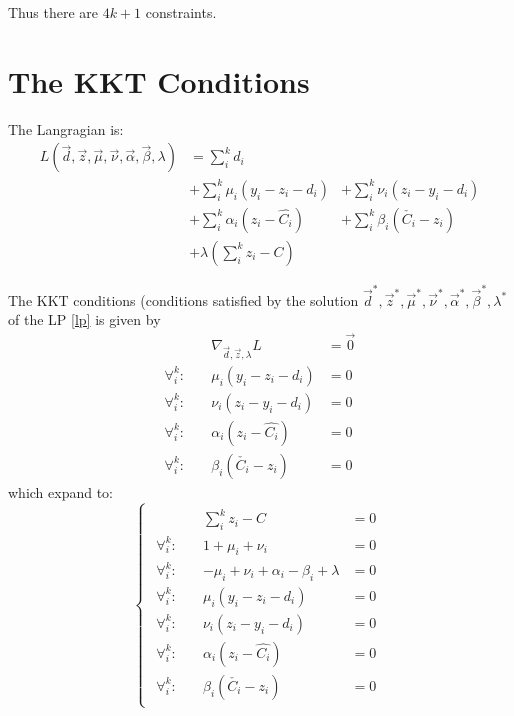 \documentclass[11 pt]{article}
\begin{document}
Thus there are $4k+1$ constraints.


\section{The KKT Conditions}

The Langragian is:
\begin{equation}
    \begin{aligned}
        L(\vec{d},\vec{z},\vec{\mu},\vec{\nu},\vec{\alpha},\vec{\beta},\lambda) & = \sum_i^k d_i \\
            & + \sum_i^k \mu_i(y_i - z_i - d_i) & + \sum_i^k \nu_i(z_i - y_i - d_i) \\
            & + \sum_i^k \alpha_i(z_i - \hat{C_i}) & + \sum_i^k \beta_i(\check{C_i} - z_i) \\
            & + \lambda (\sum_i^k z_i - C)
    \end{aligned}
\end{equation}

The KKT conditions (conditions satisfied by the solution $\vec{d}^*, \vec{z}^*, \vec{\mu}^*, \vec{\nu}^*, \vec{\alpha}^*, \vec{\beta}^*, \lambda^*$ of the LP \ref{lp} is given by
\begin{align*}
    &\nabla_{\vec{d},\vec{z},\lambda} L & = \vec{0} \\
    \forall_i^k: \quad &\mu_i(y_i - z_i - d_i) & = 0 \\
    \forall_i^k : \quad &\nu_i(z_i - y_i - d_i) & = 0 \\
    \forall_i^k : \quad &\alpha_i(z_i - \hat{C_i}) & = 0 \\
    \forall_i^k : \quad &\beta_i(\check{C_i} - z_i) & = 0
\end{align*}
which expand to:
\begin{equation}\label{eqns_kkt}
    \begin{cases}
        \begin{aligned}
            &\sum_i^k z_i - C & = 0 \\
            \forall_i^k : \quad & 1 + \mu_i + \nu_i & = 0\\
            \forall_i^k : \quad & -\mu_i + \nu_i + \alpha_i - \beta_i + \lambda & = 0 \\
            \forall_i^k : \quad & \mu_i(y_i - z_i - d_i) & = 0 \\
            \forall_i^k : \quad & \nu_i(z_i - y_i - d_i) & = 0 \\
            \forall_i^k : \quad & \alpha_i(z_i - \hat{C_i}) & = 0 \\
            \forall_i^k : \quad & \beta_i(\check{C_i} - z_i) & = 0
        \end{aligned}
    \end{cases}
\end{equation}
\end{document}
